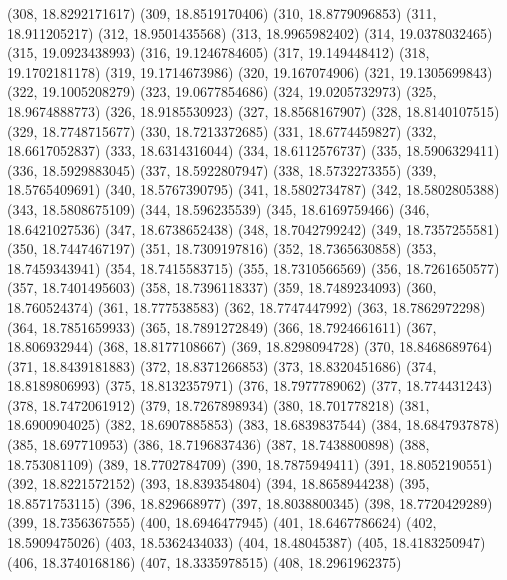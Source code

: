 {					(308, 18.8292171617)
					(309, 18.8519170406)
					(310, 18.8779096853)
					(311, 18.911205217)
					(312, 18.9501435568)
					(313, 18.9965982402)
					(314, 19.0378032465)
					(315, 19.0923438993)
					(316, 19.1246784605)
					(317, 19.149448412)
					(318, 19.1702181178)
					(319, 19.1714673986)
					(320, 19.167074906)
					(321, 19.1305699843)
					(322, 19.1005208279)
					(323, 19.0677854686)
					(324, 19.0205732973)
					(325, 18.9674888773)
					(326, 18.9185530923)
					(327, 18.8568167907)
					(328, 18.8140107515)
					(329, 18.7748715677)
					(330, 18.7213372685)
					(331, 18.6774459827)
					(332, 18.6617052837)
					(333, 18.6314316044)
					(334, 18.6112576737)
					(335, 18.5906329411)
					(336, 18.5929883045)
					(337, 18.5922807947)
					(338, 18.5732273355)
					(339, 18.5765409691)
					(340, 18.5767390795)
					(341, 18.5802734787)
					(342, 18.5802805388)
					(343, 18.5808675109)
					(344, 18.596235539)
					(345, 18.6169759466)
					(346, 18.6421027536)
					(347, 18.6738652438)
					(348, 18.7042799242)
					(349, 18.7357255581)
					(350, 18.7447467197)
					(351, 18.7309197816)
					(352, 18.7365630858)
					(353, 18.7459343941)
					(354, 18.7415583715)
					(355, 18.7310566569)
					(356, 18.7261650577)
					(357, 18.7401495603)
					(358, 18.7396118337)
					(359, 18.7489234093)
					(360, 18.760524374)
					(361, 18.777538583)
					(362, 18.7747447992)
					(363, 18.7862972298)
					(364, 18.7851659933)
					(365, 18.7891272849)
					(366, 18.7924661611)
					(367, 18.806932944)
					(368, 18.8177108667)
					(369, 18.8298094728)
					(370, 18.8468689764)
					(371, 18.8439181883)
					(372, 18.8371266853)
					(373, 18.8320451686)
					(374, 18.8189806993)
					(375, 18.8132357971)
					(376, 18.7977789062)
					(377, 18.774431243)
					(378, 18.7472061912)
					(379, 18.7267898934)
					(380, 18.701778218)
					(381, 18.6900904025)
					(382, 18.6907885853)
					(383, 18.6839837544)
					(384, 18.6847937878)
					(385, 18.697710953)
					(386, 18.7196837436)
					(387, 18.7438800898)
					(388, 18.753081109)
					(389, 18.7702784709)
					(390, 18.7875949411)
					(391, 18.8052190551)
					(392, 18.8221572152)
					(393, 18.839354804)
					(394, 18.8658944238)
					(395, 18.8571753115)
					(396, 18.829668977)
					(397, 18.8038800345)
					(398, 18.7720429289)
					(399, 18.7356367555)
					(400, 18.6946477945)
					(401, 18.6467786624)
					(402, 18.5909475026)
					(403, 18.5362434033)
					(404, 18.48045387)
					(405, 18.4183250947)
					(406, 18.3740168186)
					(407, 18.3335978515)
					(408, 18.2961962375)
}
